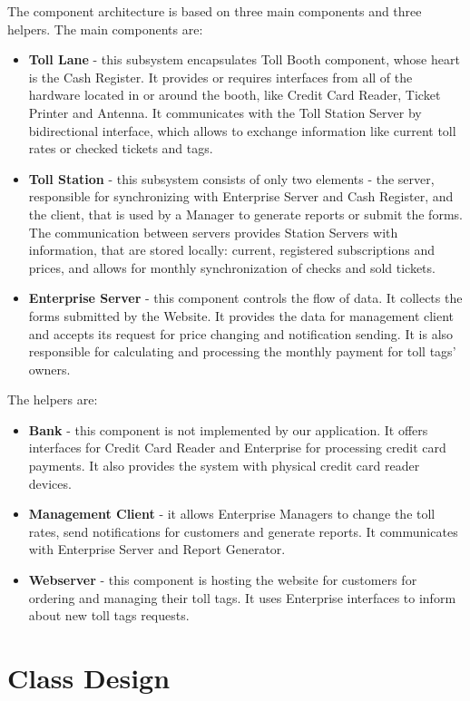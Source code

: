 The component architecture is based on three main components and three helpers. 
The main components are:
\begin{itemize}
\item \textbf{Toll Lane} - this subsystem encapsulates Toll Booth component, whose heart is the Cash Register. It provides or requires interfaces from all of the hardware located in or around the booth, like Credit Card Reader, Ticket Printer and Antenna. It communicates with the Toll Station Server by bidirectional interface, which allows to exchange information like current toll rates or checked tickets and tags.
\item \textbf{Toll Station} - this subsystem consists of only two elements - the server, responsible for synchronizing with Enterprise Server and Cash Register, and the client, that is used by a Manager to generate reports or submit the forms. The communication between servers provides Station Servers with information, that are stored locally: current, registered subscriptions and prices, and allows for monthly synchronization of checks and sold tickets. 
\item \textbf{Enterprise Server} - this component controls the flow of data. It collects the forms submitted by the Website. It provides the data for management client and accepts its request for price changing and notification sending. It is also responsible for calculating and processing the monthly payment for toll tags' owners.
\end{itemize}
The helpers are:
\begin{itemize}
\item \textbf{Bank} - this component is not implemented by our application. It offers interfaces for Credit Card Reader and Enterprise for processing credit card payments. It also provides the system with physical credit card reader devices.
\item \textbf{Management Client} - it allows Enterprise Managers to change the toll rates, send notifications for customers and generate reports. It communicates with Enterprise Server and Report Generator. 
\item \textbf{Webserver} - this component is hosting the website for customers for ordering and managing their toll tags. It uses Enterprise interfaces to inform about new toll tags requests. 
\end{itemize}

\section{Class Design}

